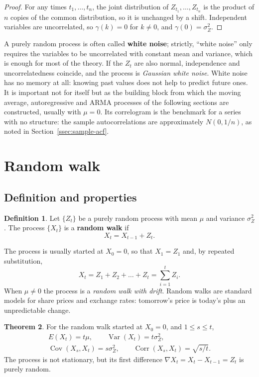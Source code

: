 \documentclass[11pt,a4paper]{article}
\theoremstyle{definition}
\newtheorem{thm}{Theorem}[subsection]
\newtheorem{defn}[thm]{Definition}
\DeclareMathOperator{\Var}{Var}
\DeclareMathOperator{\Cov}{Cov}
\DeclareMathOperator{\Corr}{Corr}
\begin{document}
\begin{proof}
For any times $t_1, \dots, t_n$, the joint distribution of $Z_{t_1}, \dots, Z_{t_n}$ is the product of $n$ copies of the
common distribution, so it is unchanged by a shift. Independent variables are uncorrelated, so $\gamma(k) = 0$ for $k \ne 0$, and $\gamma(0) = \sigma_Z^2$.
\end{proof}

A purely random process is often called \textbf{white noise}; strictly, ``white noise'' only requires the
variables to be uncorrelated with constant mean and variance, which is enough for most of the theory. If the
$Z_t$ are also normal, independence and uncorrelatedness coincide, and the process is \emph{Gaussian white
noise}. White noise has no memory at all: knowing past values does not help to predict future ones. It is
important not for itself but as the building block from which the moving average, autoregressive and ARMA
processes of the following sections are constructed, usually with $\mu = 0$. Its correlogram is the benchmark
for a series with no structure: the sample autocorrelations are approximately $N(0, 1/n)$, as noted in
Section~\ref{ssec:sample-acf}.

\section{Random walk}\label{sec:random-walk}
\subsection{Definition and properties}
\begin{defn}
Let $\{Z_t\}$ be a purely random process with mean $\mu$ and variance $\sigma_Z^2$. The process $\{X_t\}$ is a \textbf{random walk} if
\[
X_t = X_{t-1} + Z_t .
\]
\end{defn}

The process is usually started at $X_0 = 0$, so that $X_1 = Z_1$ and, by repeated substitution,
\[
X_t = Z_1 + Z_2 + \dots + Z_t = \sum_{i=1}^tZ_i .
\]
When $\mu \ne 0$ the process is a \emph{random walk with drift}. Random walks are standard models for share prices
and exchange rates: tomorrow's price is today's plus an unpredictable change.

\begin{thm}\label{thm:random-walk}
For the random walk started at $X_0 = 0$, and $1 \le s \le t$,
\begin{gather*}
E(X_t) = t\mu , \qquad \Var(X_t) = t\sigma_Z^2 , \\
\Cov(X_s, X_t) = s\sigma_Z^2 , \qquad \Corr(X_s, X_t) = \sqrt{s/t} .
\end{gather*}
The process is not stationary, but its first difference $\nabla X_t = X_t - X_{t-1} = Z_t$ is purely random.
\end{thm}
\end{document}
